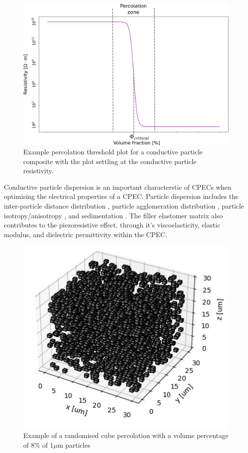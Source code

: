 \begin{figure}[H]
	\centering
	\includegraphics[width=0.6\linewidth]{Figures/percolation-plot-example.png}
	\caption{Example percolation threshold plot for a conductive particle composite with the plot settling at the conductive particle resistivity.}
	\label{fig:perc-thresh-plot}
\end{figure}

Conductive particle dispersion is an important characterstic of CPECs when optimising the electrical properties of a CPEC. Particle dispersion includes the inter-particle distance distribution \cite{Kim2012}, particle agglomeration distribution \cite{Pegel2008}, particle isotropy/anisotropy \cite{Song2022}, and sedimentation \cite{Eklund2019}. The filler elastomer matrix also contributes to the piezoresistive effect, through it's viscoelasticity, elastic modulus, and dielectric permittivity within the CPEC.

\begin{figure}[H]
    \centering
    \includegraphics[width=0.6\linewidth]{Figures/simple_random_percolation.jpg}
    \caption{Example of a randomised cube percolation with a volume percentage of 8\% of 1$\mu$m particles}
    \label{fig:simp_rand_perc}
\end{figure}

